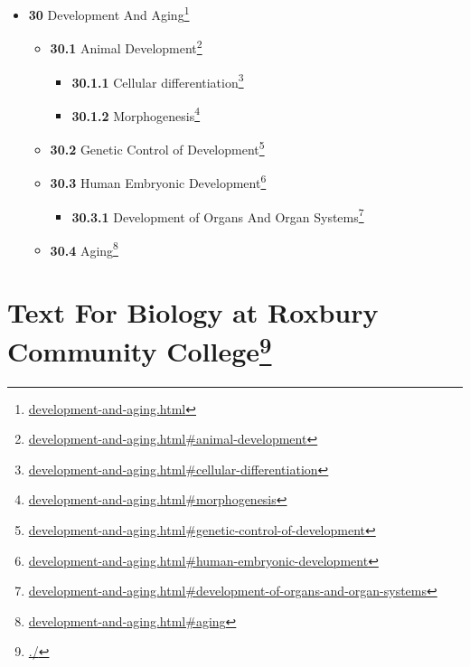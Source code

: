 \documentclass[
]{article}
\providecommand{\tightlist}{%
  \setlength{\itemsep}{0pt}\setlength{\parskip}{0pt}}
\providecommand{\tightlist}{%
  \setlength{\itemsep}{0pt}\setlength{\parskip}{0pt}}
\let\rmarkdownfootnote\footnote%
\def\footnote{\protect\rmarkdownfootnote}
\renewcommand{\href}[2]{#2\footnote{\url{#1}}}
\theoremstyle{definition}
\theoremstyle{definition}
\theoremstyle{definition}
\theoremstyle{remark}
\begin{document}
\begin{itemize}
  \begin{itemize}
  \tightlist
  \item
    \href{reproductive-systems.html\#the-human-reproductive-system}{\emph{}\textbf{29.1}
    The Human Reproductive System}
  \item
    \href{reproductive-systems.html\#the-female-reproductive-system}{\emph{}\textbf{29.2}
    The Female Reproductive System}
  \item
    \href{reproductive-systems.html\#the-male-reproductive-system}{\emph{}\textbf{29.3}
    The Male Reproductive System}
  \end{itemize}
\item
  \href{development-and-aging.html}{\emph{}\textbf{30} Development And
  Aging}

  \begin{itemize}
  \tightlist
  \item
    \href{development-and-aging.html\#animal-development}{\emph{}\textbf{30.1}
    Animal Development}

    \begin{itemize}
    \tightlist
    \item
      \href{development-and-aging.html\#cellular-differentiation}{\emph{}\textbf{30.1.1}
      Cellular differentiation}
    \item
      \href{development-and-aging.html\#morphogenesis}{\emph{}\textbf{30.1.2}
      Morphogenesis}
    \end{itemize}
  \item
    \href{development-and-aging.html\#genetic-control-of-development}{\emph{}\textbf{30.2}
    Genetic Control of Development}
  \item
    \href{development-and-aging.html\#human-embryonic-development}{\emph{}\textbf{30.3}
    Human Embryonic Development}

    \begin{itemize}
    \tightlist
    \item
      \href{development-and-aging.html\#development-of-organs-and-organ-systems}{\emph{}\textbf{30.3.1}
      Development of Organs And Organ Systems}
    \end{itemize}
  \item
    \href{development-and-aging.html\#aging}{\emph{}\textbf{30.4} Aging}
  \end{itemize}
\end{itemize}

\hypertarget{text-for-biology-at-roxbury-community-college}{%
\section{\texorpdfstring{\emph{}\href{./}{Text For Biology at Roxbury
Community
College}}{Text For Biology at Roxbury Community College}}\label{text-for-biology-at-roxbury-community-college}}
\end{document}

